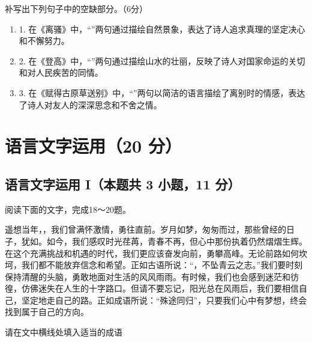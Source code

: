 \documentclass[zihao = -4]{exam-zh}
\begin{document}
       \begin{question}
         补写出下列句子中的空缺部分。（6分）
         \begin{enumerate}
           \item 1. 在《离骚》中，“\fillin[width = 5em][]”两句通过描绘自然景象，表达了诗人追求真理的坚定决心和不懈努力。

           \item 2. 在《登高》中，“\fillin[width = 5em][]”两句通过描绘山水的壮丽，反映了诗人对国家命运的关切和对人民疾苦的同情。

           \item 3. 在《赋得古原草送别》中，“\fillin[width = 5em][]”两句以简洁的语言描绘了离别时的情感，表达了诗人对友人的深深思念和不舍之情。

         \end{enumerate}
       \end{question}



       \section{语言文字运用（20 分）}

       \subsection{语言文字运用 I（本题共 3 小题，11 分）}

       阅读下面的文字，完成18～20题。

       \begin{material}
        遥想当年，\underline{\hspace*{3.5em}}，我们曾满怀激情，勇往直前。岁月如梦，匆匆而过，那些曾经的日子，犹如\underline{\hspace*{3.5em}}。如今，我们感叹时光荏苒，青春不再，但心中那份执着仍然熠熠生辉。在这个充满挑战和机遇的时代，我们更应该奋发向前，勇攀高峰。无论前路如何坎坷，我们都不能放弃信念和希望。正如古语所说：“\underline{\hspace*{3.5em}}，不坠青云之志。”我们要时刻保持清醒的头脑，勇敢地面对生活的风风雨雨。有时候，我们也会感到迷茫和彷徨，仿佛迷失在人生的十字路口。但请不要忘记，阳光总在风雨后，我们要相信自己，坚定地走自己的路。正如成语所说：“殊途同归”，只要我们心中有梦想，终会找到属于自己的方向。\\
       \end{material}

       \begin{question}
       请在文中横线处填入适当的成语
       \end{question}
\end{document}
